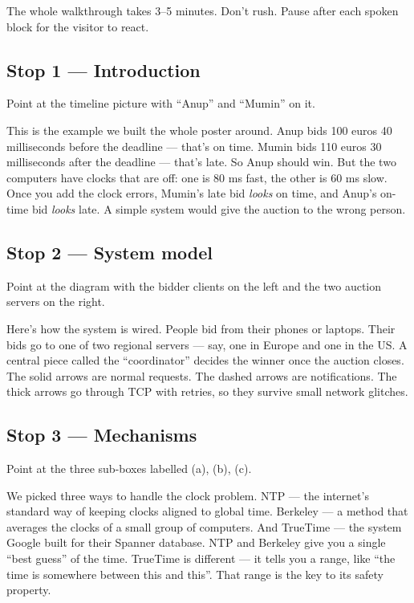 \documentclass[a4paper,11pt]{article}
\begin{document}
The whole walkthrough takes 3--5 minutes. Don't rush. Pause after
each spoken block for the visitor to react.

\subsection{Stop 1 --- Introduction}

Point at the timeline picture with ``Anup'' and ``Mumin'' on it.

\begin{spoken}
This is the example we built the whole poster around. Anup bids
100 euros 40 milliseconds before the deadline --- that's on time.
Mumin bids 110 euros 30 milliseconds after the deadline --- that's
late. So Anup should win. But the two computers have clocks that
are off: one is 80 ms fast, the other is 60 ms slow. Once you add
the clock errors, Mumin's late bid \emph{looks} on time, and
Anup's on-time bid \emph{looks} late. A simple system would give
the auction to the wrong person.
\end{spoken}

\subsection{Stop 2 --- System model}

Point at the diagram with the bidder clients on the left and the
two auction servers on the right.

\begin{spoken}
Here's how the system is wired. People bid from their phones or
laptops. Their bids go to one of two regional servers --- say,
one in Europe and one in the US. A central piece called the
``coordinator'' decides the winner once the auction closes. The
solid arrows are normal requests. The dashed arrows are
notifications. The thick arrows go through TCP with retries, so
they survive small network glitches.
\end{spoken}

\subsection{Stop 3 --- Mechanisms}

Point at the three sub-boxes labelled (a), (b), (c).

\begin{spoken}
We picked three ways to handle the clock problem. NTP --- the
internet's standard way of keeping clocks aligned to global time.
Berkeley --- a method that averages the clocks of a small group of
computers. And TrueTime --- the system Google built for their
Spanner database. NTP and Berkeley give you a single ``best
guess'' of the time. TrueTime is different --- it tells you a
range, like ``the time is somewhere between this and this''. That
range is the key to its safety property.
\end{spoken}
\end{document}
